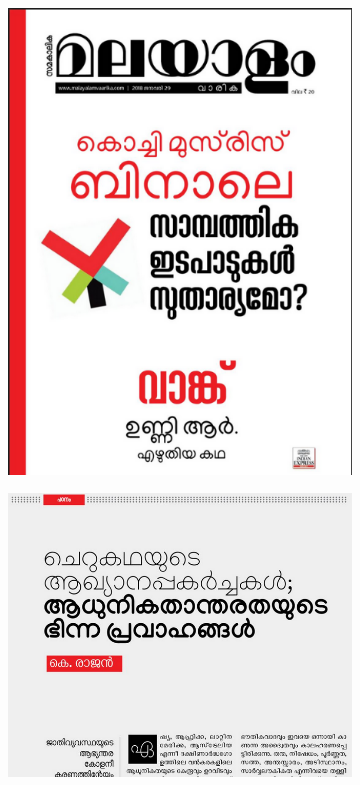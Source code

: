 \documentclass[11pt,twoside,a4paper,parskip=full]{scrartcl}
\begin{document}
\begin{figure}[h!]
	\begin{subfigure}[b]{.45\textwidth}
		
		\includegraphics[width=\linewidth]{images/manjari-sample-3.png}
		\end{subfigure}
	\begin{subfigure}[b]{.45\textwidth}
				\includegraphics[width=\linewidth]{images/manjari-sample-2.png}
	

\end{subfigure}
\end{figure}
\end{document}
